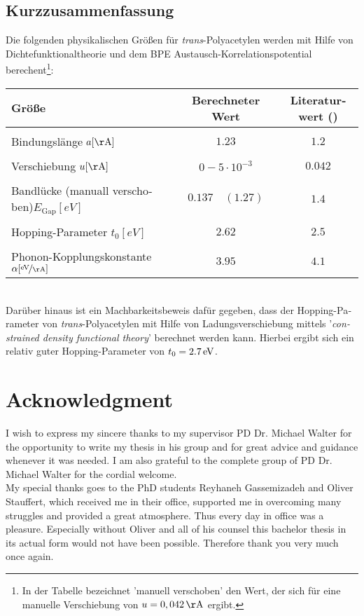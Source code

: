 \begin{otherlanguage}{german}
\chapter*{Kurzzusammenfassung}
	Die folgenden physikalischen Größen für \emph{trans}-Polyacetylen werden mit Hilfe von Dichtefunktionaltheorie und dem BPE Austausch-Korrelationspotential berechent\footnote{In der Tabelle bezeichnet 'manuell verschoben' den Wert, der sich für eine manuelle Verschiebung von \linebreak $u = \unit[0,042]{\AA}$ ergibt.}:
	\begin{table}[!h]
		\centering
		\begin{tabular}{l|c|c}
			Größe & Berechneter Wert & Literaturwert (\cite{PhysRevLett.42.1698, doi:10.1021/cr990357p})\\
			\hline \hline
			&&\\[-.3cm]
			Bindungslänge \hfill$a [\unit{\AA}]$ & $1.23$ & $1.2$\\ \hline&&\\[-.3cm]
			Verschiebung \hfill$u [\unit{\AA}]$& $0 - 5\cdot10^{-3}$ & $0.042$\\ \hline&&\\[-.3cm]
			Bandlücke (manuall verschoben)\hfill$E_\text{Gap} [\unit{eV}]$ & $0.137\quad(1.27)$ & $1.4$\\ \hline &&\\[-.3cm]
			Hopping-Parameter \hfill$t_0 [\unit{eV}]$ & $2.62$ & $2.5$ \\ \hline&&\\[-.3cm]
			Phonon-Kopplungskonstante \hspace*{2cm}$\alpha [\unitfrac{eV}{\AA}]$& $3.95$ & $4.1$
		\end{tabular}
	\end{table}\\
	Darüber hinaus ist ein Machbarkeitsbeweis dafür gegeben, dass der Hopping-Parameter von \emph{trans}-Polyacetylen mit Hilfe von Ladungsverschiebung mittels '\foreignlanguage{english}{\emph{constrained density functional theory}}' berechnet werden kann. Hierbei ergibt sich ein relativ guter Hopping-Parameter von $t_0 = \unit[2.7]{eV}$.
\end{otherlanguage}

\chapter*{Acknowledgment}

I wish to express my sincere thanks to my supervisor PD Dr. Michael Walter for the opportunity to write my thesis in his group and for great advice and guidance whenever it was needed. I am also grateful to the complete group of PD Dr. Michael Walter for the cordial welcome.\\
My special thanks goes to the PhD students Reyhaneh Gassemizadeh and Oliver Stauffert, which received me in their office, supported me in overcoming many struggles and provided a great atmosphere. Thus every day in office was a pleasure. Especially without Oliver and all of his counsel this bachelor thesis in its actual form would not have been possible. Therefore thank you very much once again.
